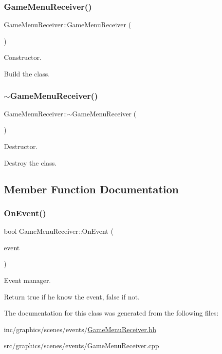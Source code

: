 \subsubsection{\texorpdfstring{Game\+Menu\+Receiver()}{GameMenuReceiver()}}
{\footnotesize\ttfamily Game\+Menu\+Receiver\+::\+Game\+Menu\+Receiver (\begin{DoxyParamCaption}{ }\end{DoxyParamCaption})}



Constructor. 

Build the class. \mbox{\label{classGameMenuReceiver_a490afacab72bebb8b1f28c3977f9ed44}} 
\subsubsection{\texorpdfstring{$\sim$\+Game\+Menu\+Receiver()}{~GameMenuReceiver()}}
{\footnotesize\ttfamily Game\+Menu\+Receiver\+::$\sim$\+Game\+Menu\+Receiver (\begin{DoxyParamCaption}{ }\end{DoxyParamCaption})}



Destructor. 

Destroy the class. 

\subsection{Member Function Documentation}
\mbox{\label{classGameMenuReceiver_af6774556abc7e3718b7bf904cc62ead0}} 
\subsubsection{\texorpdfstring{On\+Event()}{OnEvent()}}
{\footnotesize\ttfamily bool Game\+Menu\+Receiver\+::\+On\+Event (\begin{DoxyParamCaption}\item[{const irr\+::\+S\+Event \&}]{event }\end{DoxyParamCaption})}



Event manager. 

Return true if he know the event, false if not. 

The documentation for this class was generated from the following files\+:\begin{DoxyCompactItemize}
\item 
inc/graphics/scenes/events/\hyperlink{GameMenuReceiver_8hh}{Game\+Menu\+Receiver.\+hh}\item 
src/graphics/scenes/events/Game\+Menu\+Receiver.\+cpp\end{DoxyCompactItemize}
